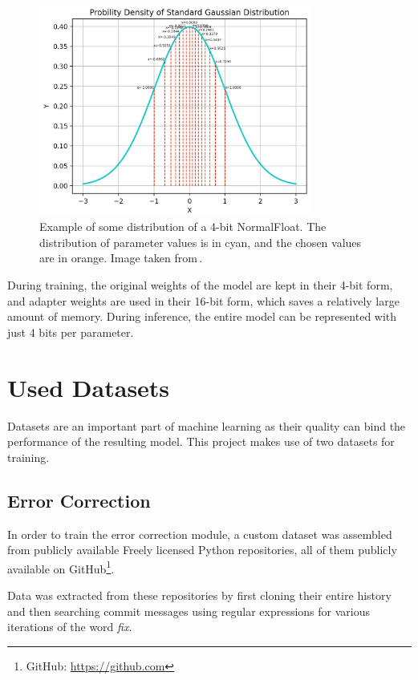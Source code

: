         \begin{figure}[H]
          \centering
          \includegraphics[width=0.8\textwidth]{obrazky-figures/qlora-normal-distribution.png}
          \caption{Example of some distribution of a 4-bit NormalFloat. The distribution of parameter values is in cyan, and the chosen values are in orange. Image taken from\,\cite{June2023qlora}.}
          \label{fig:qlora-distribution}
        \end{figure}
        
        During training, the original weights of the model are kept in their 4-bit form, and adapter weights are used in their 16-bit form, which saves a relatively large amount of memory. During inference, the entire model can be represented with just 4 bits per parameter.

\section{Used Datasets}
    Datasets are an important part of machine learning as their quality can bind the performance of the resulting model. This project makes use of two datasets for training.
    
    \subsection{Error Correction}
        In order to train the error correction module, a custom dataset was assembled from publicly available Freely licensed Python repositories, all of them publicly available on GitHub\footnote{GitHub: \url{https://github.com}}.
        
        Data was extracted from these repositories by first cloning their entire history and then searching commit messages using regular expressions for various iterations of the word \emph{fix}.
        
